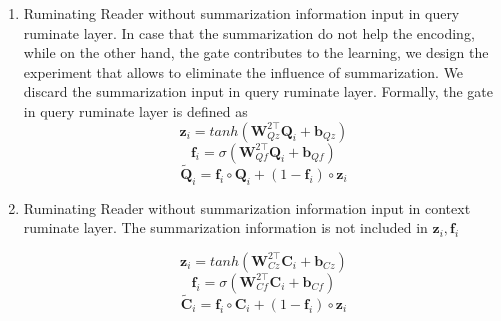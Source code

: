 \documentclass[11pt,letterpaper]{article}
\begin{document}
\begin{enumerate}
\item Ruminating Reader without summarization information input in query ruminate layer. In case that the summarization do not help the encoding, while on the other hand, the gate contributes to the learning, we design the experiment that allows to eliminate the influence of summarization. We discard the summarization input in query ruminate layer. Formally, the gate in query ruminate layer is defined as
\begin{equation}
\bm{z}_i = tanh(\bm{W}^{2\top}_{Qz}\bm{Q}_i + \bm{b}_{Qz}  )
\end{equation}
\begin{equation}
\bm{f}_i = \sigma(\bm{W}^{2\top}_{Qf}\bm{Q}_i + \bm{b}_{Qf})
\end{equation}
\begin{equation}
\tilde{\bm{Q}}_i = \bm{f}_i \circ \bm{Q}_i + (1-\bm{f}_i)\circ \bm{z}_i
\end{equation}

\item Ruminating Reader without summarization information input in context ruminate layer. The summarization information is not included in $\bm{z}_i, \bm{f}_i$

\begin{equation}
\bm{z}_i = tanh(\bm{W}^{2\top}_{Cz}\bm{C}_i + \bm{b}_{Cz})
\end{equation}
\begin{equation}
\bm{f}_i = \sigma(\bm{W}^{2\top}_{Cf}\bm{C}_i + \bm{b}_{Cf})
\end{equation}
\begin{equation}
\tilde{\bm{C}}_i = \bm{f}_i \circ \bm{C}_i + (1-\bm{f}_i) \circ \bm{z}_i
\end{equation}

\end{enumerate}

 
\end{document}
